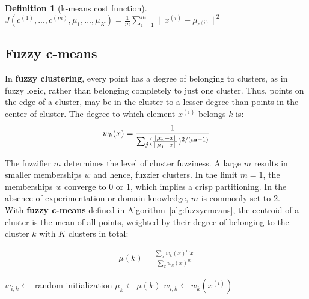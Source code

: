 \documentclass{report}
\newtheorem{definition}{Definition}[section]
\begin{document}
\begin{definition}[k-means cost function]~\\
$J(c^{(1)}, ..., c^{(m)}, \mu_1, ..., \mu_K)=\frac{1}{m}\sum_{i=1}^m \lVert x^{(i)}-\mu_{c^{(i)}}\rVert^2 $
\end{definition}

\subsection{Fuzzy c-means}
In {\bf fuzzy clustering}, every point has a degree of belonging to clusters, as in fuzzy logic, rather than belonging completely to just one cluster.
Thus, points on the edge of a cluster, may be in the cluster to a lesser degree than points in the center of cluster.
The degree to which element $x^{(i)}$ belongs $k$ is:
\begin{align*}
w_k(x) = \frac{1}{\sum_j(\frac{\lVert \mu_k - x \Vert}{\lVert \mu_j - x \Vert})^{2/({\bf m}-1)}}
\end{align*}

The fuzzifier $m$ determines the level of cluster fuzziness.
A large $m$ results in smaller memberships $w$ and hence, fuzzier clusters.
In the limit $m = 1$, the memberships $w$ converge to $0$ or $1$, which implies a crisp partitioning.
In the absence of experimentation or domain knowledge, $m$ is commonly set to $2$. \\

With {\bf fuzzy c-means} defined in Algorithm~\ref{alg:fuzzycmeans}, the centroid of a cluster is the mean of all points, weighted by their degree of belonging to the cluster $k$ with $K$ clusters in total:

\begin{align*}
\mu(k) = \frac{\sum_x w_k(x)^mx}{\sum_x w_k(x)^m}
\end{align*}

\begin{algorithm}
\caption{Fuzzy c-means}
\label{alg:fuzzycmeans}
\begin{algorithmic}
\State $w_{i, k} \gets$ random initialization 
\Repeat
{}
\State $\mu_k \gets \mu(k)$ 
\EndFor
{}
\State $w_{i, k} \gets w_k(x^{(i)}) $ 
\EndFor
{}
\end{algorithmic}
\end{algorithm}
\end{document}
